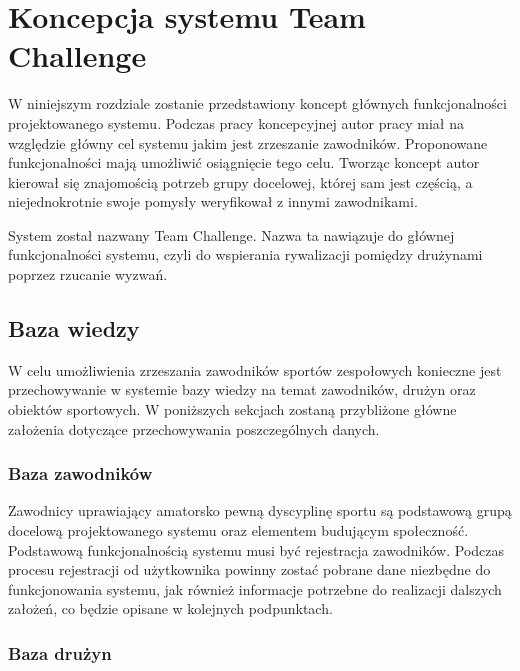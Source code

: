 \chapter{Koncepcja systemu Team Challenge}

W niniejszym rozdziale zostanie przedstawiony koncept głównych funkcjonalności projektowanego systemu. Podczas pracy koncepcyjnej autor pracy miał na względzie główny cel systemu jakim jest zrzeszanie zawodników. Proponowane funkcjonalności mają umożliwić osiągnięcie tego celu. Tworząc koncept autor kierował się znajomością potrzeb grupy docelowej, której sam jest częścią, a niejednokrotnie swoje pomysły weryfikował z innymi zawodnikami.


System został nazwany Team Challenge. Nazwa ta nawiązuje do głównej funkcjonalności systemu, czyli do wspierania rywalizacji pomiędzy drużynami poprzez rzucanie wyzwań.

  
\section{Baza wiedzy}

W celu umożliwienia zrzeszania zawodników sportów zespołowych konieczne jest przechowywanie w systemie bazy wiedzy na temat zawodników, drużyn oraz obiektów sportowych. W poniższych sekcjach zostaną przybliżone główne założenia dotyczące przechowywania poszczególnych danych.
  
\subsection{Baza zawodników}

Zawodnicy uprawiający amatorsko pewną dyscyplinę sportu są podstawową grupą docelową projektowanego systemu oraz elementem budującym społeczność. Podstawową funkcjonalnością systemu musi być rejestracja zawodników. Podczas procesu rejestracji od użytkownika powinny zostać pobrane dane niezbędne do funkcjonowania systemu, jak również informacje potrzebne do realizacji dalszych założeń, co będzie opisane w kolejnych podpunktach.

\subsection{Baza drużyn}

